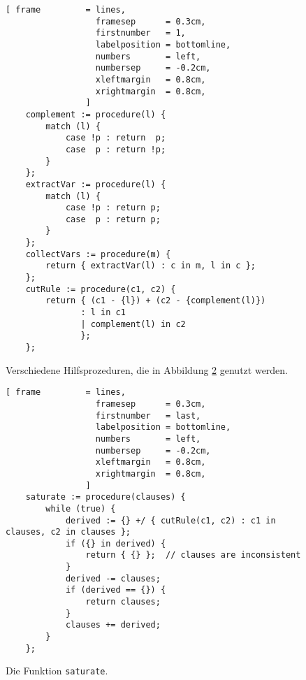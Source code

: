 \begin{figure}[!ht]
\centering
\begin{Verbatim}[ frame         = lines, 
                  framesep      = 0.3cm, 
                  firstnumber   = 1,
                  labelposition = bottomline,
                  numbers       = left,
                  numbersep     = -0.2cm,
                  xleftmargin   = 0.8cm,
                  xrightmargin  = 0.8cm,
                ]
    complement := procedure(l) {
        match (l) {
            case !p : return  p;
            case  p : return !p;
        }
    };
    extractVar := procedure(l) {
        match (l) {
            case !p : return p;
            case  p : return p;
        }
    };
    collectVars := procedure(m) {
        return { extractVar(l) : c in m, l in c };
    };
    cutRule := procedure(c1, c2) {
        return { (c1 - {l}) + (c2 - {complement(l)}) 
               : l in c1
               | complement(l) in c2
               };
    };
\end{Verbatim}
\vspace*{-0.3cm}
\caption{Verschiedene Hilfsprozeduren, die in Abbildung \ref{fig:completeness.stlx-2} genutzt werden.}
\label{fig:completeness.stlx-1}
\end{figure}

\begin{figure}[!ht]
\centering
\begin{Verbatim}[ frame         = lines, 
                  framesep      = 0.3cm, 
                  firstnumber   = last,
                  labelposition = bottomline,
                  numbers       = left,
                  numbersep     = -0.2cm,
                  xleftmargin   = 0.8cm,
                  xrightmargin  = 0.8cm,
                ]
    saturate := procedure(clauses) {
        while (true) {
            derived := {} +/ { cutRule(c1, c2) : c1 in clauses, c2 in clauses };
            if ({} in derived) {
                return { {} };  // clauses are inconsistent
            }
            derived -= clauses;
            if (derived == {}) {
                return clauses;
            }
            clauses += derived;
        }
    };
\end{Verbatim}
\vspace*{-0.3cm}
\caption{Die Funktion \texttt{saturate}.}
\label{fig:completeness.stlx-2}
\end{figure}

